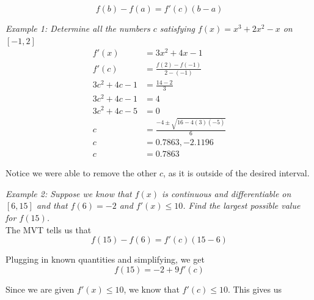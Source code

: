 \documentclass{article}
\begin{document}
            \begin{equation*}
                f(b) - f(a) = f'(c) (b-a)
            \end{equation*}

            \noindent \color{blue} \textit{Example 1: Determine all the numbers $c$ satisfying
            $f(x)=x^3+2x^2-x$ on $[-1,2]$} \color{black} \\

            \begin{align*}
                f'(x) &= 3x^2+4x-1 \\
                f'(c) &= \frac{f(2)-f(-1)}{2-(-1)} \\
                3c^2+4c-1 &= \frac{14-2}{3} \\
                3c^2+4c-1 &= 4 \\
                3c^2+4c-5 &= 0 \\
                c &= \frac{-4\pm\sqrt{16-4(3)(-5)}}{6} \\
                c &= 0.7863, -2.1196 \\
                c &= 0.7863
            \end{align*}

            \noindent Notice we were able to remove the other $c$, as it is outside of the desired interval.

            \noindent \color{blue} \textit{Example 2: Suppose we know that $f(x)$ is continuous and
            differentiable on $[6,15]$ and that $f(6)=-2$ and $f'(x)\leq10$. Find the
            largest possible value for $f(15)$.} \color{black} \\

            \noindent The MVT tells us that \\

            \begin{equation*}
                f(15) - f(6) = f'(c)(15-6)
            \end{equation*}

            \noindent Plugging in known quantities and simplifying, we get \\

            \begin{equation*}
                f(15) = -2 + 9f'(c)
            \end{equation*}

            \noindent Since we are given $f'(x)\leq 10$, we know that $f'(c)\leq 10$. This gives us \\
\end{document}

